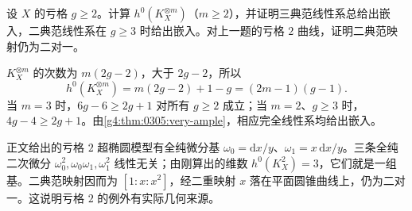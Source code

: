 \begin{exercise}
	\label{g4:ex:0305:pluricanonical}
	设 \(X\) 的亏格 \(g\ge2\)。计算 \(h^0(K_X^{\otimes m})\)（\(m\ge2\)），并证明三典范线性系总给出嵌入，二典范线性系在 \(g\ge3\) 时给出嵌入。对上一题的亏格 \(2\) 曲线，证明二典范映射仍为二对一。
\end{exercise}
\begin{solution}
	\(K_X^{\otimes m}\) 的次数为 \(m(2g-2)\)，大于 \(2g-2\)，所以
	\[
		h^0(K_X^{\otimes m})=m(2g-2)+1-g=(2m-1)(g-1).
	\]
	当 \(m=3\) 时，\(6g-6\ge2g+1\) 对所有 \(g\ge2\) 成立；当 \(m=2\)、\(g\ge3\) 时，\(4g-4\ge2g+1\)。由\cref{g4:thm:0305:very-ample}，相应完全线性系均给出嵌入。

	正文给出的亏格 \(2\) 超椭圆模型有全纯微分基 \(\omega_0=\mathrm{d}x/y\)、\(\omega_1=x\,\mathrm{d}x/y\)。三条全纯二次微分 \(\omega_0^2,\omega_0\omega_1,\omega_1^2\) 线性无关；由刚算出的维数 \(h^0(K_X^2)=3\)，它们就是一组基。二典范映射因而为 \([1:x:x^2]\)，经二重映射 \(x\) 落在平面圆锥曲线上，仍为二对一。这说明亏格 \(2\) 的例外有实际几何来源。
\end{solution}

